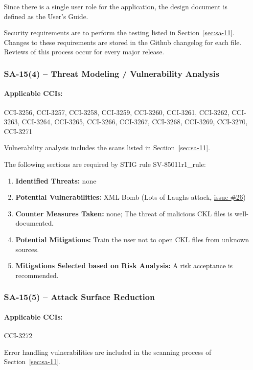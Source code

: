 \documentclass[letterpaper, 10pt, twoside]{article}
\begin{document}
Since there is a single user role for the application, the design document is defined as the User's Guide.

Security requirements are to perform the testing listed in Section~\ref{sec:sa-11}. Changes to these requirements are stored in the Github changelog for each file. Reviews of this process occur for every major release.

\subsubsection{SA-15(4) -- Threat Modeling / Vulnerability Analysis}

\paragraph{Applicable CCIs:} CCI-3256, CCI-3257, CCI-3258, CCI-3259, CCI-3260, CCI-3261, CCI-3262, CCI-3263, CCI-3264, CCI-3265, CCI-3266, CCI-3267, CCI-3268, CCI-3269, CCI-3270, CCI-3271

Vulnerability analysis includes the scans listed in Section~\ref{sec:sa-11}.

The following sections are required by STIG rule SV-85011r1\_rule:
\begin{enumerate}
	\item \textbf{Identified Threats:} none
	\item \textbf{Potential Vulnerabilities:} XML Bomb (Lots of Laughs attack, \href{https://github.com/squinky86/STIGQter/issues/26}{issue \#26})
	\item \textbf{Counter Measures Taken:} none; The threat of malicious CKL files is well-documented.
	\item \textbf{Potential Mitigations:} Train the user not to open CKL files from unknown sources.
	\item \textbf{Mitigations Selected based on Risk Analysis:} A risk acceptance is recommended.
\end{enumerate}

\subsubsection{SA-15(5) -- Attack Surface Reduction}

\paragraph{Applicable CCIs:} CCI-3272

Error handling vulnerabilities are included in the scanning process of Section~\ref{sec:sa-11}.
\end{document}
